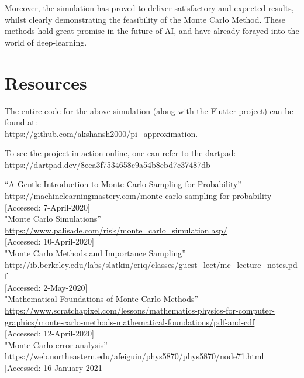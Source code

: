 \documentclass{resonance}
\begin{document}
	Moreover, the simulation has proved to deliver satisfactory and expected results, whilst clearly demonstrating the feasibility of the Monte Carlo Method. These methods hold great promise in the future of AI, and have already forayed into the world of deep-learning.
	
	\section{Resources}
	The entire code for the above simulation (along with the Flutter project) can be found at:\\ \textcolor{blue}{\url{https://github.com/akshansh2000/pi_approximation}}.
	
	To see the project in action online, one can refer to the dartpad:\\
	\textcolor{blue}{\url{https://dartpad.dev/8eea3f7534658c9a54b8ebd7c37487db}}
	
	\pagebreak
	\begin{thebibliography}{99}
		
		\vspace{5pt}
		“A Gentle Introduction to Monte Carlo Sampling for Probability”\\ \textcolor{blue}{\url{https://machinelearningmastery.com/monte-carlo-sampling-for-probability}}\\
		{[Accessed: 7-April-2020]}\\
		
		"Monte Carlo Simulations”\\ \textcolor{blue}{\url{https://www.palisade.com/risk/monte_carlo_simulation.asp/}}\\
		{[Accessed: 10-April-2020]}\\
		
		"Monte Carlo Methods and Importance Sampling”\\ \textcolor{blue}{\url{http://ib.berkeley.edu/labs/slatkin/eriq/classes/guest\_lect/mc\_lecture\_notes.pdf}}\\
		{[Accessed: 2-May-2020]}\\
		
		"Mathematical Foundations of Monte Carlo Methods”\\ \textcolor{blue}{\url{https://www.scratchapixel.com/lessons/mathematics-physics-for-computer-graphics/monte-carlo-methods-mathematical-foundations/pdf-and-cdf}}\\
		{[Accessed: 12-April-2020]}\\
		
		"Monte Carlo error analysis”\\ \textcolor{blue}{\url{https://web.northeastern.edu/afeiguin/phys5870/phys5870/node71.html}}\\
		{[Accessed: 16-January-2021]}\\
		
	\end{thebibliography}
	
\end{document}
